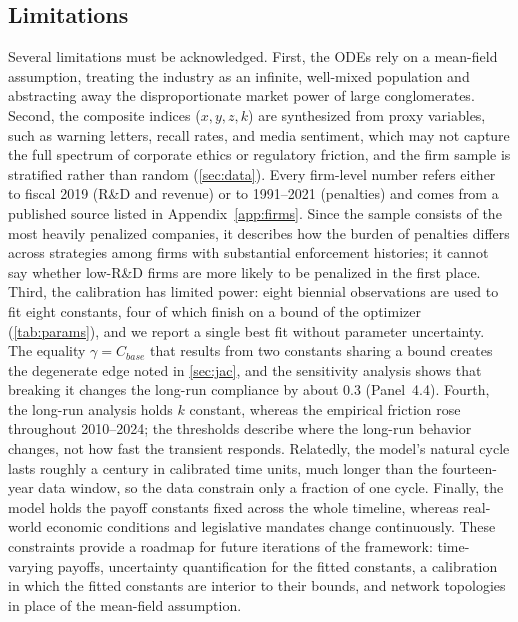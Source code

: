 \documentclass[10pt]{article}
\begin{document}
\subsection{Limitations}\label{sec:limitations}
Several limitations must be acknowledged. First, the ODEs rely on a mean-field assumption, treating the industry as an infinite, well-mixed population and abstracting away the disproportionate market power of large conglomerates. Second, the composite indices ($x,y,z,k$) are synthesized from proxy variables, such as warning letters, recall rates, and media sentiment, which may not capture the full spectrum of corporate ethics or regulatory friction, and the firm sample is stratified rather than random (\cref{sec:data}). Every firm-level number refers either to fiscal 2019 (R\&D and revenue) or to 1991--2021 (penalties) and comes from a published source listed in Appendix~\ref{app:firms}. Since the sample consists of the most heavily penalized companies, it describes how the burden of penalties differs across strategies among firms with substantial enforcement histories; it cannot say whether low-R\&D firms are more likely to be penalized in the first place.  Third, the calibration has limited power: eight biennial observations are used to fit eight constants, four of which finish on a bound of the optimizer (\cref{tab:params}), and we report a single best fit without parameter uncertainty. The equality $\gamma=C_{base}$ that results from two constants sharing a bound creates the degenerate edge noted in \cref{sec:jac}, and the sensitivity analysis shows that breaking it changes the long-run compliance by about $0.3$ (Panel~4.4). Fourth, the long-run analysis holds $k$ constant, whereas the empirical friction rose throughout 2010--2024; the thresholds describe where the long-run behavior changes, not how fast the transient responds. Relatedly, the model's natural cycle lasts roughly a century in calibrated time units, much longer than the fourteen-year data window, so the data constrain only a fraction of one cycle. Finally, the model holds the payoff constants fixed across the whole timeline, whereas real-world economic conditions and legislative mandates change continuously. These constraints provide a roadmap for future iterations of the framework: time-varying payoffs, uncertainty quantification for the fitted constants, a calibration in which the fitted constants are interior to their bounds, and network topologies in place of the mean-field assumption.
\end{document}
